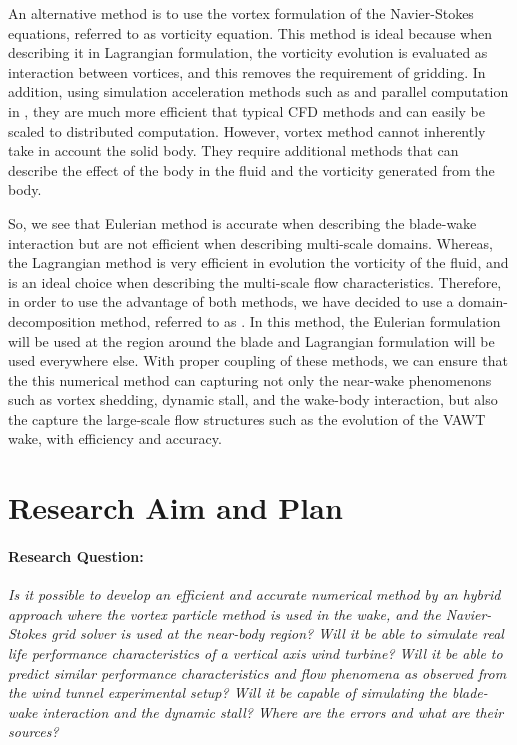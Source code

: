 An alternative method is to use the vortex formulation of the Navier-Stokes equations, referred to as vorticity equation. This method is ideal because when describing it in Lagrangian formulation, the vorticity evolution is evaluated as interaction between vortices, and this removes the requirement of gridding. In addition, using simulation acceleration methods such as  and parallel computation in , they are much more efficient that typical CFD methods and can easily be scaled to distributed computation. However, vortex method cannot inherently take in account the solid body. They require additional methods that can describe the effect of the body in the fluid and the vorticity generated from the body.

So, we see that Eulerian method is accurate when describing the blade-wake interaction but are not efficient when describing multi-scale domains. Whereas, the Lagrangian method is very efficient in evolution the vorticity of the fluid, and is an ideal choice when describing the multi-scale flow characteristics. Therefore, in order to use the advantage of both methods, we have decided to use a domain-decomposition method, referred to as . In this method, the Eulerian formulation will be used at the region around the blade and Lagrangian formulation will be used everywhere else. With proper coupling of these methods, we can ensure that the this numerical method can capturing not only the near-wake phenomenons such as vortex shedding, dynamic stall, and the wake-body interaction, but also the capture the large-scale flow structures such as the evolution of the VAWT wake, with efficiency and accuracy.

\section{Research Aim and Plan}

\paragraph*{Research Question:} \textit{Is it possible to develop an efficient and accurate numerical method by an
hybrid approach where the vortex particle method is used in the wake, and the Navier-Stokes grid solver is
used at the near-body region? Will it be able to simulate real life performance characteristics of a vertical
axis wind turbine? Will it be able to predict similar performance characteristics and flow phenomena as observed from the wind tunnel experimental setup? Will it be capable of simulating the blade-wake interaction
and the dynamic stall? Where are the errors and what are their sources?}

